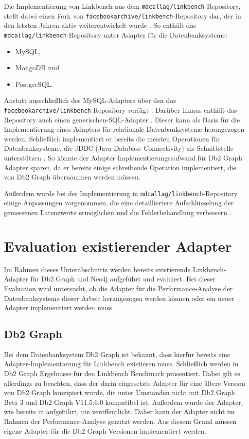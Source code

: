 Die Implementierung von Linkbench aus dem \texttt{mdcallag/linkbench}-Repository, stellt dabei einen Fork von \texttt{facebookarchive\allowbreak /linkbench}-Repository dar, der in den letzten Jahren aktiv weiterentwickelt wurde \cite{mc_linkbench_github}. So enthält das \texttt{mdcallag/linkbench}-Repository unter \cite{mc_linkbench_github} Adapter für die Datenbanksysteme: 
\begin{itemize}
    \item MySQL,
    \item MongoDB und
    \item PostgreSQL.
\end{itemize}
Anstatt ausschließlich des MySQL-Adapters über den das \texttt{facebookarchive/\break linkbench}-Repository verfügt \cite{mc_linkbench_github}. Darüber hinaus enthält das Repository auch einen generischen-SQL-Adapter \cite{mc_linkbench_github}. Dieser kann als Basis für die Implementierung eines Adapters für relationale Datenbanksysteme herangezogen \cite{mc_linkbench_github} werden. Schließlich implementiert er bereits die meisten Operationen für Datenbanksysteme, die JDBC (Java Database Connectivity) als Schnittstelle unterstützen \cite{mc_linkbench_github}. So könnte der Adapter Implementierungsaufwand für Db2 Graph Adapter sparen, da er bereits einige schreibende Operation implementiert, die von Db2 Graph übernommen werden müssen.

Außerdem wurde bei der Implementierung in \texttt{mdcallag/linkbench}-Repository einige Anpassungen vorgenommen, die eine detailliertere Aufschlüsselung der gemessenen Latenzwerte ermöglichen und die Fehlerbehandlung verbessern \cite{mc_linkbench_github}.

\section{Evaluation existierender Adapter}
\label{implementierung:evaluation}
Im Rahmen dieses Unterabschnitts werden bereits existierende Linkbench-Adapter für Db2 Graph und Neo4j aufgeführt und evaluiert. Bei dieser Evaluation wird untersucht, ob die Adapter für die Performance-Analyse der Datenbanksysteme dieser Arbeit herangezogen werden können oder ein neuer Adapter implementiert werden muss. 

\subsection{Db2 Graph}
\label{implementierung:evaluation:db2graph}
Bei dem Datenbanksystem Db2 Graph ist bekannt, dass hierfür bereits eine Adapter-Implementierung für Linkbench existieren muss. Schließlich werden in \cite{sigmod_tian} Db2 Graph Ergebnisse für den Linkbench Benchmark präsentiert. Dabei gilt es allerdings zu beachten, dass der darin eingesetzte Adapter für eine ältere Version von Db2 Graph konzipiert wurde, die unter Umständen nicht mit Db2 Graph Beta 3 und Db2 Graph V11.5.6.0 kompatibel ist. Außerdem wurde der Adapter, wie bereits in  aufgeführt, nie veröffentlicht. Daher kann der Adapter nicht im Rahmen der Performance-Analyse genutzt werden. Aus diesem Grund müssen eigene Adapter für die Db2 Graph Versionen implementiert werden. 

